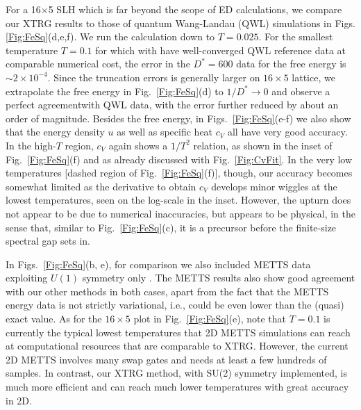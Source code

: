 \documentclass[aps,prx,twocolumn,showpacs,psfig,superscriptaddress,longbibliography]{revtex4-1}
\newcommand{\Fig}[1]{Fig.~\ref{#1}}
\def\Dstar{D^\ast}
\begin{document}
For a 16$\times$5 SLH which is far beyond the
scope of ED calculations, we compare our XTRG results to those of
quantum Wang-Landau (QWL) simulations \cite{Bauer.b+:2011:ALPS} in
Figs. \ref{Fig:FeSq}(d,e,f).  We run the calculation down to
$T=0.025$.  For the smallest temperature $T=0.1$ for which with have
well-converged QWL reference data at comparable numerical cost, the
error in the $\Dstar=600$ data for the free energy is $\sim 2
\times10^{-4}$.  Since the truncation errors is generally larger on
$16\times5$ lattice, we extrapolate the free energy in
\Fig{Fig:FeSq}(d) to $1/\Dstar\to 0$ and observe a perfect
agreementwith QWL data, with the error further reduced by about an
order of magnitude.
%
Besides the free energy, in Figs.~\ref{Fig:FeSq}(e-f) we also show
that the energy density $u$ as well as specific heat $c_V$ all have
very good accuracy.  In the high-$T$ region, $c_V$ again shows a
$1/T^2$ relation, as shown in the inset of Fig.~\ref{Fig:FeSq}(f)
and as already discussed with \Fig{Fig:CvFit}. In the very low
temperatures [dashed region of \Fig{Fig:FeSq}(f)], though, our
accuracy becomes somewhat limited as the derivative to obtain $c_V$
develops minor wiggles at the lowest temperatures, seen on the
log-scale in the inset. However, the upturn does not appear to be
due to numerical inaccuracies, but appears to be physical, in the
sense that, similar to \Fig{Fig:FeSq}(c), it is a precursor before
the finite-size spectral gap sets in.

In Figs.~\ref{Fig:FeSq}(b, e), for comparison we also included METTS
data exploiting $U(1)$ symmetry only \cite{Bruognolo.b+:2017:MPS}.
The METTS results also show good agreement with our other methods in
both cases, apart from the fact that the METTS energy data is not
strictly variational, i.e., could be even lower than the (quasi)
exact value.  As for the $16\times5$ plot in Fig.~\ref{Fig:FeSq}(e),
note that $T=0.1$ is currently the typical lowest temperatures that
2D METTS simulations can reach \cite{Bruognolo.b+:2017:MPS} 
 {at computational resources that are comparable to XTRG}. 
However, the current 2D
METTS involves many swap gates and needs at least a few hundreds of
samples.  In contrast, our XTRG method, with SU(2) symmetry
implemented, is much more efficient and can reach much lower
temperatures with great accuracy in 2D.
\end{document}
